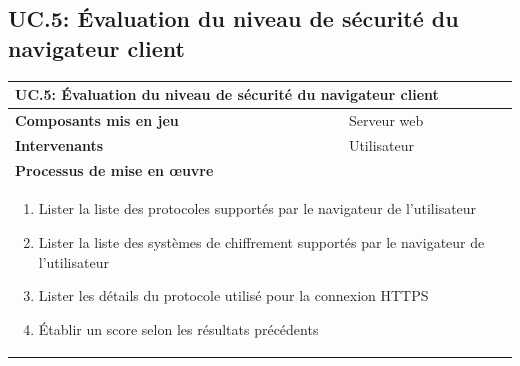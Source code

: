 \documentclass[a4paper,11pt,french]{article}
\begin{document}
\subsection{UC.5: Évaluation du niveau de sécurité du navigateur client}
\begin{center}
	\vspace*{0.7cm}
	\begin{tabularx}{16cm}{|l|X|}
	\hline
	\multicolumn{2}{|l|}{\textbf{UC.5: Évaluation du niveau de sécurité du navigateur client}}\\
	\hline
	\textbf{Composants mis en jeu} & Serveur web\\
	\hline
	\textbf{Intervenants} & Utilisateur\\
	\hline
	\multicolumn{2}{|l|}{\textbf{Processus de mise en \oe uvre}}\\
	\hline
	\multicolumn{2}{|p{15cm}|}{
	\begin{enumerate}
	\item Lister la liste des protocoles supportés par le navigateur de l'utilisateur
	\item Lister la liste des systèmes de chiffrement supportés par le navigateur de l'utilisateur
	\item Lister les détails du protocole utilisé pour la connexion HTTPS
	\item Établir un score selon les résultats précédents
	\end{enumerate}
	}\\
	\hline
	\end{tabularx}
\end{center}

\begin{center}

\end{center}
\end{document}
